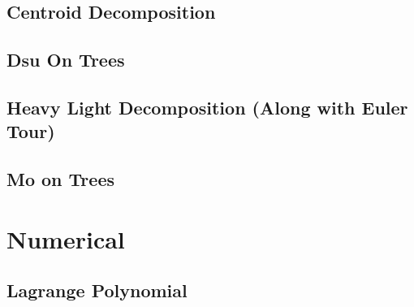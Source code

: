 \subsection{Centroid Decomposition}
\raggedbottom
\hrulefill
\subsection{Dsu On Trees}
\raggedbottom
\hrulefill
\subsection{Heavy Light Decomposition (Along with Euler Tour)}
\raggedbottom
\hrulefill
\subsection{Mo on Trees}
\raggedbottom
\hrulefill

\section{Numerical}
\subsection{Lagrange Polynomial}
\raggedbottom
\hrulefill

